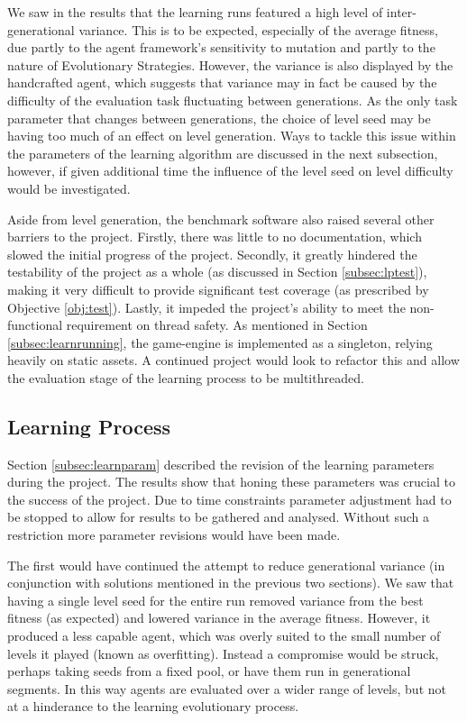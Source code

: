 We saw in the results that the learning runs featured a high level of inter-generational variance. This is to be expected, especially of the average fitness, due partly to the agent framework's sensitivity to mutation and partly to the nature of Evolutionary Strategies. However, the variance is also displayed by the handcrafted agent, which suggests that variance may in fact be caused by the difficulty of the evaluation task fluctuating between generations. As the only task parameter that changes between generations, the choice of level seed may be having too much of an effect on level generation. Ways to tackle this issue within the parameters of the learning algorithm are discussed in the next subsection, however, if given additional time the influence of the level seed on level difficulty would be investigated.

Aside from level generation, the benchmark software also raised several other barriers to the project. Firstly, there was little to no documentation, which slowed the initial progress of the project. Secondly, it greatly hindered the testability of the project as a whole (as discussed in Section \ref{subsec:lptest}), making it very difficult to provide significant test coverage (as prescribed by Objective \ref{obj:test}). Lastly, it impeded the project's ability to meet the non-functional requirement on thread safety. As mentioned in Section \ref{subsec:learnrunning}, the game-engine is implemented as a singleton, relying heavily on static assets. A continued project would look to refactor this and allow the evaluation stage of the learning process to be multithreaded.




\subsection{Learning Process}

Section \ref{subsec:learnparam} described the revision of the learning parameters during the project. The results show that honing these parameters was crucial to the success of the project. Due to time constraints parameter adjustment had to be stopped to allow for results to be gathered and analysed. Without such a restriction more parameter revisions would have been made.

The first would have continued the attempt to reduce generational variance (in conjunction with solutions mentioned in the previous two sections). We saw that having a single level seed for the entire run removed variance from the best fitness (as expected) and lowered variance in the average fitness. However, it produced a less capable agent, which was overly suited to the small number of levels it played (known as overfitting). Instead a compromise would be struck, perhaps taking seeds from a fixed pool, or have them run in generational segments. In this way agents are evaluated over a wider range of levels, but not at a hinderance to the learning evolutionary process.


